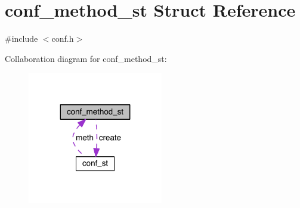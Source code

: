 \hypertarget{structconf__method__st}{}\section{conf\+\_\+method\+\_\+st Struct Reference}
\label{structconf__method__st}


{\ttfamily \#include $<$conf.\+h$>$}



Collaboration diagram for conf\+\_\+method\+\_\+st\+:\nopagebreak
\begin{figure}[H]
\begin{center}
\leavevmode
\includegraphics[width=167pt]{structconf__method__st__coll__graph}
\end{center}
\end{figure}

